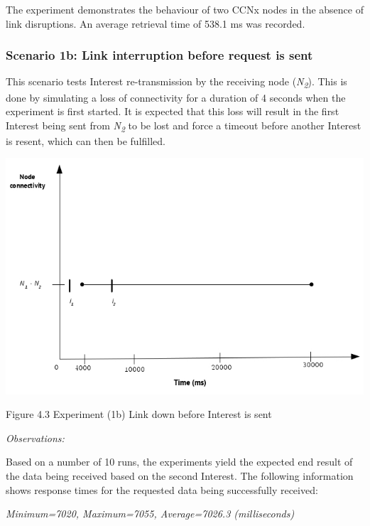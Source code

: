 \documentclass[a4paper,12pt]{report}      %
\begin{document}
The experiment demonstrates the behaviour of two CCNx nodes in the absence of link disruptions. An average retrieval time of 538.1 ms was recorded.

\subsubsection{Scenario 1b: Link interruption before request is sent}

This scenario tests Interest re-transmission by the receiving node (\emph{N\textsubscript{2}}). This is done by simulating a
loss of connectivity for a duration of 4 seconds when the experiment is first started. It is expected that this loss will result in
the first Interest being sent from \emph{N\textsubscript{2}} to be lost and force a timeout before another Interest is resent, which can then be fulfilled.

\noindent\includegraphics[scale=0.55]{exp1b_timediag.jpg}\newline
\begin{center}Figure 4.3 Experiment (1b) Link down before Interest is sent\end{center}

\vspace*{1\baselineskip}\noindent\emph{Observations:}

Based on a number of 10 runs, the experiments yield the expected end result of the data being received
based on the second Interest. The following information shows response times for the requested
data being successfully received:
\begin{center}\textsl{Minimum=7020, Maximum=7055, Average=7026.3 (milliseconds)}\end{center}
\end{document}
